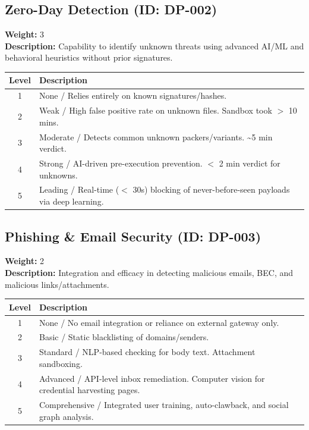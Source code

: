 \documentclass{article}
\begin{document}
\subsection{Zero-Day Detection (ID: DP-002)}
\textbf{Weight:} 3 \\
\textbf{Description:} Capability to identify unknown threats using advanced AI/ML and behavioral heuristics without prior signatures.
\vspace{0.3cm}
\begin{longtable}{|c|p{12cm}|}
\hline
\rowcolor{lightgray} \textbf{Level} & \textbf{Description} \\ \hline
1 & None / Relies entirely on known signatures/hashes. \\ \hline
2 & Weak / High false positive rate on unknown files. Sandbox took $>$ 10 mins. \\ \hline
3 & Moderate / Detects common unknown packers/variants. \textasciitilde{}5 min verdict. \\ \hline
4 & Strong / AI-driven pre-execution prevention. $<$ 2 min verdict for unknowns. \\ \hline
5 & Leading / Real-time ($<$ 30s) blocking of never-before-seen payloads via deep learning. \\ \hline
\end{longtable}
\vspace{0.5cm}
\subsection{Phishing \& Email Security (ID: DP-003)}
\textbf{Weight:} 2 \\
\textbf{Description:} Integration and efficacy in detecting malicious emails, BEC, and malicious links/attachments.
\vspace{0.3cm}
\begin{longtable}{|c|p{12cm}|}
\hline
\rowcolor{lightgray} \textbf{Level} & \textbf{Description} \\ \hline
1 & None / No email integration or reliance on external gateway only. \\ \hline
2 & Basic / Static blacklisting of domains/senders. \\ \hline
3 & Standard / NLP-based checking for body text. Attachment sandboxing. \\ \hline
4 & Advanced / API-level inbox remediation. Computer vision for credential harvesting pages. \\ \hline
5 & Comprehensive / Integrated user training, auto-clawback, and social graph analysis. \\ \hline
\end{longtable}
\vspace{0.5cm}
\end{document}

